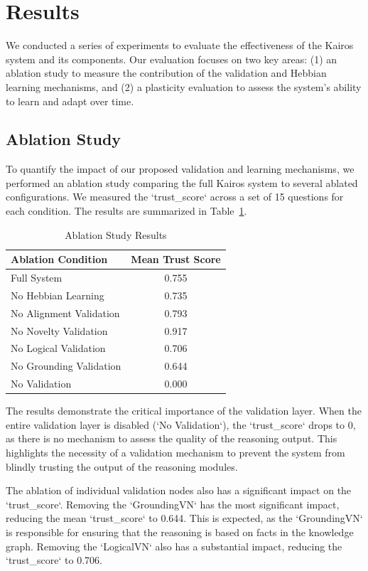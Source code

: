 \section{Results}

We conducted a series of experiments to evaluate the effectiveness of the Kairos system and its components. Our evaluation focuses on two key areas: (1) an ablation study to measure the contribution of the validation and Hebbian learning mechanisms, and (2) a plasticity evaluation to assess the system's ability to learn and adapt over time.

\subsection{Ablation Study}

To quantify the impact of our proposed validation and learning mechanisms, we performed an ablation study comparing the full Kairos system to several ablated configurations. We measured the `trust_score` across a set of 15 questions for each condition. The results are summarized in Table~\ref{tab:ablation}.

\begin{table}[h]
\caption{Ablation Study Results}
\label{tab:ablation}
\centering
\begin{tabular}{lc}
\toprule
\textbf{Ablation Condition} & \textbf{Mean Trust Score} \\
\midrule
Full System & 0.755 \\
No Hebbian Learning & 0.735 \\
No Alignment Validation & 0.793 \\
No Novelty Validation & 0.917 \\
No Logical Validation & 0.706 \\
No Grounding Validation & 0.644 \\
No Validation & 0.000 \\
\bottomrule
\end{tabular}
\end{table}

The results demonstrate the critical importance of the validation layer. When the entire validation layer is disabled (`No Validation`), the `trust_score` drops to 0, as there is no mechanism to assess the quality of the reasoning output. This highlights the necessity of a validation mechanism to prevent the system from blindly trusting the output of the reasoning modules.

The ablation of individual validation nodes also has a significant impact on the `trust_score`. Removing the `GroundingVN` has the most significant impact, reducing the mean `trust_score` to 0.644. This is expected, as the `GroundingVN` is responsible for ensuring that the reasoning is based on facts in the knowledge graph. Removing the `LogicalVN` also has a substantial impact, reducing the `trust_score` to 0.706.

